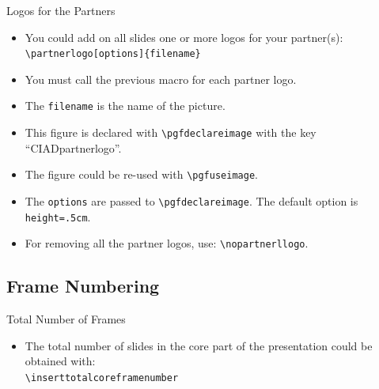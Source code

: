 \documentclass[english,sectioncirclenumberstyle]{ciadbeamer}
\begin{document}
\begin{frame}{Logos for the Partners}
	\begin{itemize}
	\item You could add on all slides one or more logos for your partner(s): \\
		\texttt{{\textbackslash}partnerlogo[options]\{filename\}}
	\item You must call the previous macro for each partner logo.
	\item The \texttt{filename} is the name of the picture.
	\vspace{1em}
	\item This figure is declared with \texttt{{\textbackslash}pgfdeclareimage} with the key ``CIADpartnerlogo''.
	\item The figure could be re-used with \texttt{{\textbackslash}pgfuseimage}.
	\item The \texttt{options} are passed to \texttt{{\textbackslash}pgfdeclareimage}. The default option is \texttt{height=.5cm}.
	\item For removing all the partner logos, use: \texttt{{\textbackslash}nopartnerllogo}.
	\end{itemize}
\end{frame}



\subsection{Frame Numbering}

\begin{frame}{Total Number of Frames}
	\begin{itemize}
	\item The total number of slides in the core part of the presentation could be obtained with: \\
		\texttt{{\textbackslash}inserttotalcoreframenumber}
	\end{itemize}
\end{frame}
\end{document}
